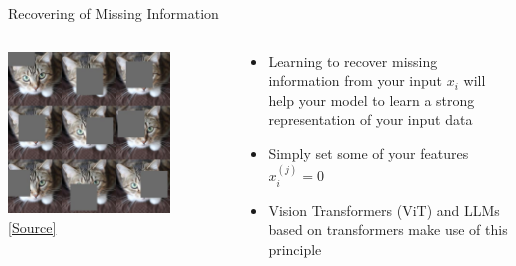 \documentclass[aspectratio=169]{../latex_main/tntbeamer}  %
\begin{document}
    \begin{frame}[c]{Recovering of Missing Information}

        \begin{columns}
    
        \begin{column}{0.5\textwidth}
    
            \includegraphics[width=0.75\textwidth]{figure/cutout.jpg}\\
            {\footnotesize \href{https://github.com/xkumiyu/numpy-data-augmentation}{[Source]}}
            
        \end{column}
    
        \begin{column}{0.5\textwidth}
    
            \begin{itemize}
                \item Learning to recover missing information from your input $x_i$ will help your model to learn a strong representation of your input data
                \item Simply set some of your features $x_i^{(j)} = 0$
                \item Vision Transformers (ViT) and LLMs based on transformers make use of this principle
            \end{itemize}
            
        \end{column}
    
        \end{columns}
    
        
    \end{frame}
\end{document}

